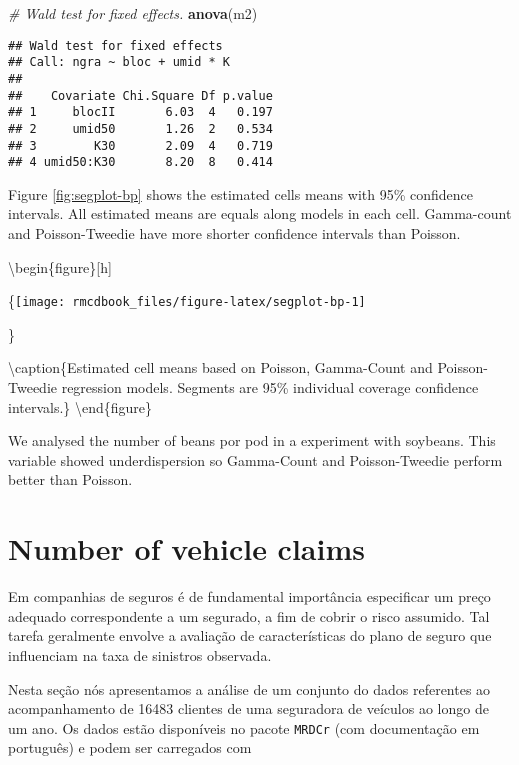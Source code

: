 \documentclass[9pt,a5paper,]{book}
\newenvironment{Shaded}{}{}
\newcommand{\KeywordTok}[1]{\textbf{{#1}}}
\newcommand{\CommentTok}[1]{\textit{{#1}}}
\newcommand{\NormalTok}[1]{{#1}}
\renewenvironment{Shaded}{\color{inputcolor}}{}
\theoremstyle{definition}
\theoremstyle{definition}
\theoremstyle{remark}
\begin{document}
\begin{Shaded}
\begin{Highlighting}[]
\CommentTok{# Wald test for fixed effects.}
\KeywordTok{anova}\NormalTok{(m2)}
\end{Highlighting}
\end{Shaded}

\begin{verbatim}
## Wald test for fixed effects
## Call: ngra ~ bloc + umid * K
## 
##    Covariate Chi.Square Df p.value
## 1     blocII       6.03  4   0.197
## 2     umid50       1.26  2   0.534
## 3        K30       2.09  4   0.719
## 4 umid50:K30       8.20  8   0.414
\end{verbatim}

Figure \ref{fig:segplot-bp} shows the estimated cells means with 95\%
confidence intervals. All estimated means are equals along models in
each cell. Gamma-count and Poisson-Tweedie have more shorter confidence
intervals than Poisson.

\textbackslash{}begin\{figure\}{[}h{]}

\{\centering \texttt{[image: rmcdbook\_files/figure-latex/segplot-bp-1]}

\}

\textbackslash{}caption\{Estimated cell means based on Poisson,
Gamma-Count and Poisson-Tweedie regression models. Segments are 95\%
individual coverage confidence intervals.\}\label{fig:segplot-bp}
\textbackslash{}end\{figure\}

We analysed the number of beans por pod in a experiment with soybeans.
This variable showed underdispersion so Gamma-Count and Poisson-Tweedie
perform better than Poisson.

\section{Number of vehicle claims}\label{number-of-vehicle-claims}

Em companhias de seguros é de fundamental importância especificar um
preço adequado correspondente a um segurado, a fim de cobrir o risco
assumido. Tal tarefa geralmente envolve a avaliação de características
do plano de seguro que influenciam na taxa de sinistros observada.

Nesta seção nós apresentamos a análise de um conjunto do dados
referentes ao acompanhamento de 16483 clientes de uma seguradora de
veículos ao longo de um ano. Os dados estão disponíveis no pacote
\texttt{MRDCr} (com documentação em português) e podem ser carregados
com
\end{document}
